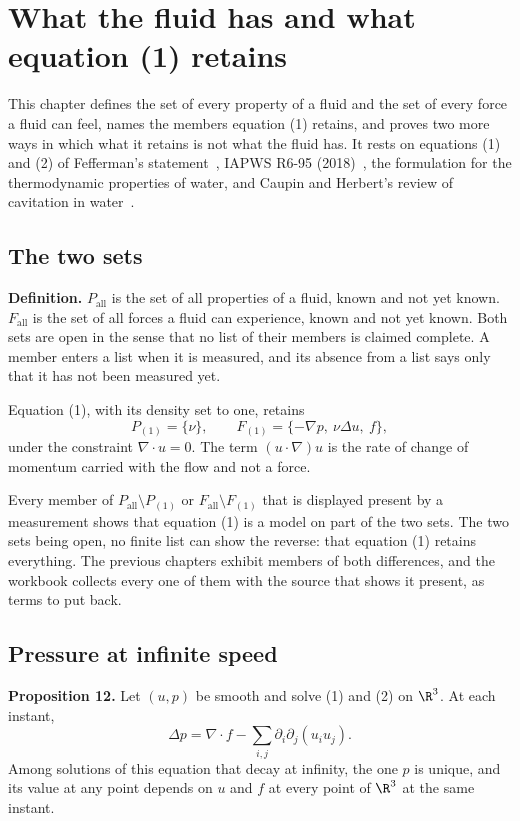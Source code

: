 \chapter{What the fluid has and what equation (1) retains}

This chapter defines the set of every property of a fluid and the set of every force a fluid can
feel, names the members equation (1) retains, and proves two more ways in which what it retains is not
what the fluid has. It rests on equations (1) and (2) of Fefferman's
statement~\cite{src:Fefferman}, IAPWS R6-95 (2018)~\cite{src:IAPWS-R6-95-2018}, the formulation
for the thermodynamic properties of water, and Caupin and Herbert's review of cavitation in
water~\cite{src:Caupin-and-Herbert-2006}.

\section{The two sets}

\textbf{Definition.} $P_{\mathrm{all}}$ is the set of all properties of a fluid, known and not yet
known. $F_{\mathrm{all}}$ is the set of all forces a fluid can experience, known and not yet known.
Both sets are open in the sense that no list of their members is claimed complete. A member enters
a list when it is measured, and its absence from a list says only that it has not been measured
yet.

Equation (1), with its density set to one, retains
\[
P_{(1)} = \{\nu\},
\qquad
F_{(1)} = \{-\nabla p,\ \nu\Delta u,\ f\},
\]
under the constraint $\nabla\cdot u = 0$. The term $(u\cdot\nabla)u$ is the rate of change of
momentum carried with the flow and not a force.

Every member of $P_{\mathrm{all}}\setminus P_{(1)}$ or $F_{\mathrm{all}}\setminus F_{(1)}$ that is
displayed present by a measurement shows that equation (1) is a model on part of the two sets. The two sets being
open, no finite list can show the reverse: that equation (1) retains everything. The previous chapters
exhibit members of both differences, and the workbook collects every one of them with the source
that shows it present, as terms to put back.

\section{Pressure at infinite speed}

\textbf{Proposition 12.} Let $(u,p)$ be smooth and solve (1) and (2) on $\R^3$. At each instant,
\[
\Delta p = \nabla\cdot f - \sum_{i,j}\partial_i\partial_j(u_iu_j).
\]
Among solutions of this equation that decay at infinity, the one $p$ is unique, and its value at
any point depends on $u$ and $f$ at every point of $\R^3$ at the same instant.

